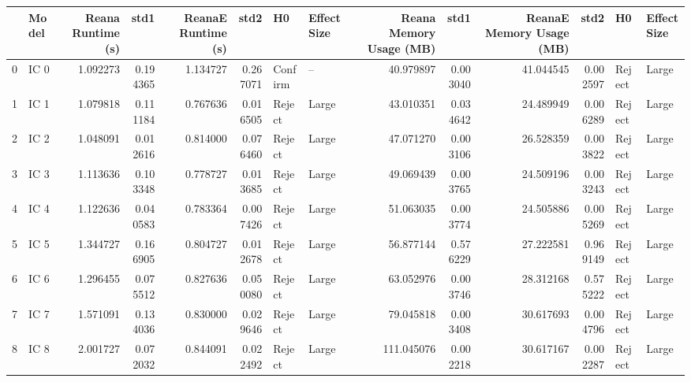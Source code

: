 \begin{tabular}{llrrrrllrrrrll}
\toprule
{} &  Model &  Reana Runtime (s) &       std1 &  ReanaE Runtime (s) &      std2 &       H0 & Effect Size &  Reana Memory Usage (MB) &        std1 &  ReanaE Memory Usage (MB) &       std2 &      H0 & Effect Size \\
\midrule
0  &   IC 0 &           1.092273 &   0.194365 &            1.134727 &  0.267071 &  Confirm &          -- &                40.979897 &    0.003040 &                 41.044545 &   0.002597 &  Reject &       Large \\
1  &   IC 1 &           1.079818 &   0.111184 &            0.767636 &  0.016505 &   Reject &       Large &                43.010351 &    0.034642 &                 24.489949 &   0.006289 &  Reject &       Large \\
2  &   IC 2 &           1.048091 &   0.012616 &            0.814000 &  0.076460 &   Reject &       Large &                47.071270 &    0.003106 &                 26.528359 &   0.003822 &  Reject &       Large \\
3  &   IC 3 &           1.113636 &   0.103348 &            0.778727 &  0.013685 &   Reject &       Large &                49.069439 &    0.003765 &                 24.509196 &   0.003243 &  Reject &       Large \\
4  &   IC 4 &           1.122636 &   0.040583 &            0.783364 &  0.007426 &   Reject &       Large &                51.063035 &    0.003774 &                 24.505886 &   0.005269 &  Reject &       Large \\
5  &   IC 5 &           1.344727 &   0.166905 &            0.804727 &  0.012678 &   Reject &       Large &                56.877144 &    0.576229 &                 27.222581 &   0.969149 &  Reject &       Large \\
6  &   IC 6 &           1.296455 &   0.075512 &            0.827636 &  0.050080 &   Reject &       Large &                63.052976 &    0.003746 &                 28.312168 &   0.575222 &  Reject &       Large \\
7  &   IC 7 &           1.571091 &   0.134036 &            0.830000 &  0.029646 &   Reject &       Large &                79.045818 &    0.003408 &                 30.617693 &   0.004796 &  Reject &       Large \\
8  &   IC 8 &           2.001727 &   0.072032 &            0.844091 &  0.022492 &   Reject &       Large &               111.045076 &    0.002218 &                 30.617167 &   0.002287 &  Reject &       Large \\

\end{tabular}
